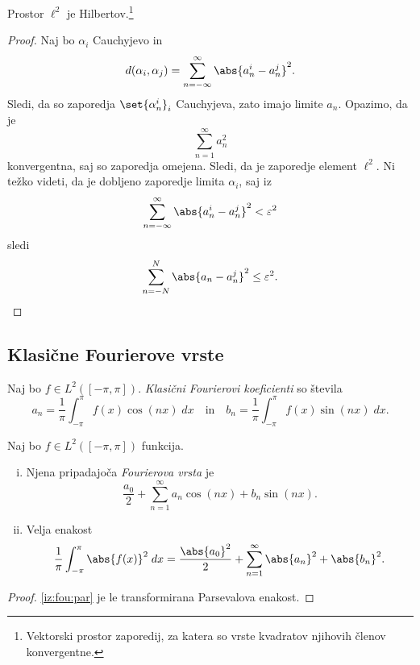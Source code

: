 \begin{trditev}
Prostor $\ell^2$ je Hilbertov.\footnote{Vektorski prostor
zaporedij, za katera so vrste kvadratov njihovih členov
konvergentne.}
\end{trditev}

\begin{proof}
Naj bo $\alpha_i$ Cauchyjevo in
\[
d(\alpha_i,\alpha_j) = \sum_{n=-\infty}^\infty \abs{a_n^i-a_n^j}^2.
\]
Sledi, da so zaporedja $\set{\alpha_n^i}_i$ Cauchyjeva, zato imajo
limite $a_n$. Opazimo, da je
\[
\sum_{n=1}^\infty a_n^2
\]
konvergentna, saj so zaporedja omejena. Sledi, da je zaporedje
element $\ell^2$. Ni težko videti, da je dobljeno zaporedje limita
$\alpha_i$, saj iz
\[
\sum_{n=-\infty}^\infty \abs{a_n^i - a_n^j}^2 < \varepsilon^2
\]
sledi
\[
\sum_{n=-N}^N \abs{a_n - a_n^j}^2 \leq \varepsilon^2. \qedhere
\]
\end{proof}

\newpage

\subsection{Klasične Fourierove vrste}


\begin{definicija}
Naj bo $f \in L^2([-\pi,\pi])$. \emph{Klasični Fourierovi
koeficienti} so
števila
\[
a_n = \frac{1}{\pi} \int_{-\pi}^\pi f(x)\cos(nx)\;dx
\quad \text{in} \quad
b_n = \frac{1}{\pi} \int_{-\pi}^\pi f(x)\sin(nx)\;dx.
\]
\end{definicija}

\begin{trditev}
Naj bo $f \in L^2([-\pi,\pi])$ funkcija.

\begin{enumerate}[i)]
\item Njena pripadajoča
\emph{Fourierova vrsta} je
\[
\frac{a_0}{2} + \sum_{n=1}^\infty a_n \cos(nx) + b_n \sin(nx).
\]
\item Velja enakost
\[
\frac{1}{\pi} \int_{-\pi}^\pi \abs{f(x)}^2\;dx =
\frac{\abs{a_0}^2}{2} + \sum_{n=1}^\infty \abs{a_n}^2+\abs{b_n}^2.
\]
\label{iz:fou:par}
\end{enumerate}
\end{trditev}

\begin{proof}
\ref{iz:fou:par} je le transformirana Parsevalova enakost.
\end{proof}

